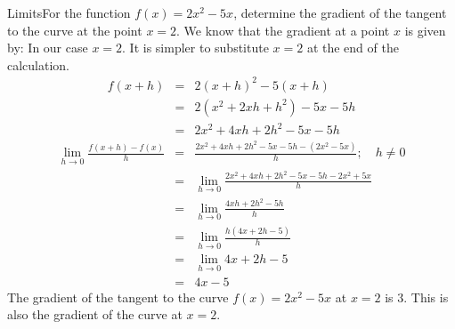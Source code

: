

\begin{wex}{Limits}{For the function $f(x)=2x^2-5x$, determine the 
gradient of the tangent to the curve 
at the point $x=2$.}{
We know that the gradient at a point $x$ is given by:
In our case $x=2$. It is simpler to substitute $x=2$ at the end of the calculation.
\begin{eqnarray*}
f(x+h)&=&2(x+h)^2-5(x+h)\\
&=&2(x^2+2xh+h^2)-5x-5h\\
&=&2x^2+4xh+2h^2-5x-5h
\end{eqnarray*}
\begin{eqnarray*}
\lim_{h \to 0}\frac{f(x+h)-f(x)}{h}&=&\frac{2x^2+4xh+2h^2-5x-5h - (2x^2-5x)}{h};\quad h\neq0\\
&=&\lim_{h \to 0}\frac{2x^2+4xh+2h^2-5x-5h - 2x^2+5x}{h}\\
&=&\lim_{h \to 0}\frac{4xh+2h^2-5h}{h}\\
&=&\lim_{h \to 0}\frac{h(4x+2h-5)}{h}\\
&=&\lim_{h \to 0}4x+2h-5\\
&=&4x-5
\end{eqnarray*}
The gradient of the tangent to the curve $f(x)=2x^2-5x$ at $x=2$ is $3$. This is also the gradient of the curve at $x=2$.
}\end{wex}

